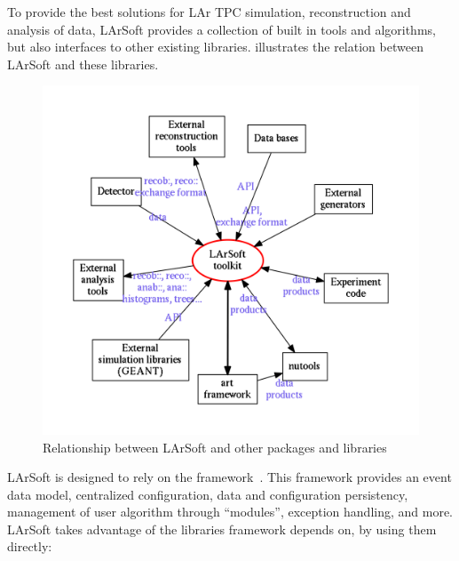 
%
%
%

To provide the best solutions for LAr TPC simulation, reconstruction and
analysis of data, LArSoft provides a collection of built in tools and
algorithms, but also interfaces to other existing libraries.
 illustrates the relation between LArSoft and
these libraries.

\begin{figure}
	\includegraphics[width=\textwidth]{figures/LArSoftArchitectureSimplifiedGraph}
	\caption{\label{fig:LArSoftRelations}
		Relationship between LArSoft and other packages and libraries
	}
\end{figure}

LArSoft is designed to rely on the \ART framework~\cite{ART}.
This framework provides an event data model, centralized configuration, data
and configuration persistency, management of user algorithm through
``modules'', exception handling, and more. LArSoft takes advantage of
the libraries \ART framework depends on, by using them directly:

